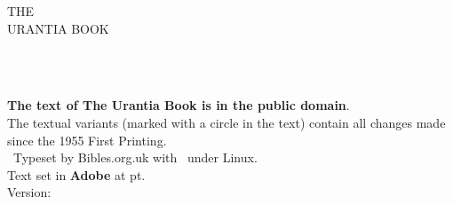 \begin{center}
{
\bibcovertitlefont
THE\\[1ex]
\fontsize{24}{24}\selectfont
URANTIA BOOK\\
}
\titlesepbig\\
\end{center}

\titleframe

\newpage

\begin{center}
\\
\parbox{0.9\linewidth}{\centering
\textbf{The text of The Urantia Book is in the public domain}.\\[5pt]
The textual variants (marked with a circle in the text) contain all changes made since the 1955 First Printing.\\
\tux\ Typeset by Bibles.org.uk with \XeLaTeX\ under Linux.\\
Text set in \textbf{Adobe \urantiamainfont} at \urantiamainfontsize pt.\\[18pt]
\upshape\normalsize{} Version: \mytoday{}\\
}
\end{center}

\titleframe
